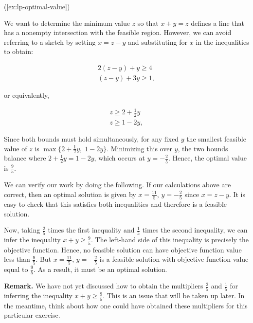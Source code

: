\begin{solution}(\ref{ex:lp-optimal-value})

We want to determine the minimum value \(z\) so that \(x+y=z\) defines
a line that has a nonempty intersection with the feasible region.
However, we can avoid referring to a sketch by setting \(x=z-y\) and
substituting for \(x\) in the inequalities to obtain:

\begin{eqnarray*}
2(z-y) + y \geq 4 \\
(z-y) + 3y \geq 1,
\end{eqnarray*}

or equivalently,

\begin{eqnarray*}
z \geq 2+\frac{1}{2}y \\
z \geq 1-2y,
\end{eqnarray*}

Since both bounds must hold simultaneously, for any fixed \(y\) the
smallest feasible value of \(z\) is
\(\max \{ 2+\frac{1}{2}y,\; 1-2y\}\). Minimizing this over \(y\),
the two bounds balance where \(2+\frac{1}{2}y = 1-2y\), which occurs at
\(y = -\frac{2}{5}\). Hence, the optimal value is \(\frac{9}{5}\).

We can verify our work by doing the following. If our calculations
above are correct, then an optimal solution is given by
\(x = \frac{11}{5}\), \(y = -\frac{2}{5}\) since \(x = z - y\). It is
easy to check that this satisfies both inequalities and therefore is a
feasible solution.

Now, taking \(\frac{2}{5}\) times the first inequality and
\(\frac{1}{5}\) times the second inequality, we can infer the
inequality \(x+y \geq \frac{9}{5}\). The left-hand side of this
inequality is precisely the objective function. Hence, no feasible
solution can have objective function value less than \(\frac{9}{5}\).
But \(x = \frac{11}{5}\), \(y = -\frac{2}{5}\) is a feasible solution
with objective function value equal to \(\frac{9}{5}\). As a result,
it must be an optimal solution.

\textbf{Remark.} We have not yet discussed how to obtain the
multipliers \(\frac{2}{5}\) and \(\frac{1}{5}\) for inferring the
inequality \(x+y \geq \frac{9}{5}\). This is an issue that will be
taken up later. In the meantime, think about how one could have
obtained these multipliers for this particular exercise.
\end{solution}

